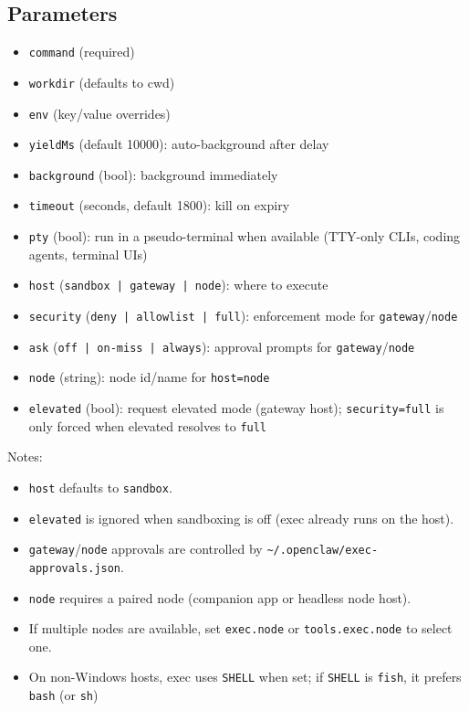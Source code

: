 \subsection{Parameters}


\begin{itemize}
  \item \texttt{command} (required)
  \item \texttt{workdir} (defaults to cwd)
  \item \texttt{env} (key/value overrides)
  \item \texttt{yieldMs} (default 10000): auto-background after delay
  \item \texttt{background} (bool): background immediately
  \item \texttt{timeout} (seconds, default 1800): kill on expiry
  \item \texttt{pty} (bool): run in a pseudo-terminal when available (TTY-only CLIs, coding agents, terminal UIs)
  \item \texttt{host} (\texttt{sandbox | gateway | node}): where to execute
  \item \texttt{security} (\texttt{deny | allowlist | full}): enforcement mode for \texttt{gateway}/\texttt{node}
  \item \texttt{ask} (\texttt{off | on-miss | always}): approval prompts for \texttt{gateway}/\texttt{node}
  \item \texttt{node} (string): node id/name for \texttt{host=node}
  \item \texttt{elevated} (bool): request elevated mode (gateway host); \texttt{security=full} is only forced when elevated resolves to \texttt{full}
\end{itemize}


Notes:

\begin{itemize}
  \item \texttt{host} defaults to \texttt{sandbox}.
  \item \texttt{elevated} is ignored when sandboxing is off (exec already runs on the host).
  \item \texttt{gateway}/\texttt{node} approvals are controlled by \texttt{\textasciitilde{}/.openclaw/exec-approvals.json}.
  \item \texttt{node} requires a paired node (companion app or headless node host).
  \item If multiple nodes are available, set \texttt{exec.node} or \texttt{tools.exec.node} to select one.
  \item On non-Windows hosts, exec uses \texttt{SHELL} when set; if \texttt{SHELL} is \texttt{fish}, it prefers \texttt{bash} (or \texttt{sh})
\end{itemize}

